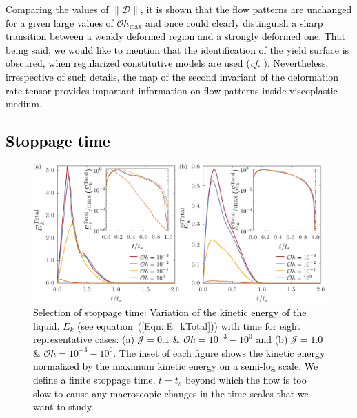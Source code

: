 \documentclass[final]{jfm}
\newcommand*\red{\textcolor{black}}
\begin{document}
\red{Comparing the values of $\|\boldsymbol{\mathcal{D}}\|$, it is shown that the flow patterns are unchanged for a given large values of $\mathcal{O}h_{\text{max}}$ and once could clearly distinguish a sharp transition between a weakly deformed region and a strongly deformed one. That being said, we would like to mention that the identification of the yield surface is obscured, when regularized constitutive models are used (\textit{cf.} \cite{frigaard2005usage}). Nevertheless, irrespective of such details, the map of the second invariant of the deformation rate tensor provides important information on flow patterns inside viscoplastic medium.}

\subsection{\red{Stoppage time}}\label{App::StoppageTime}
\begin{figure}
	\centerline{\includegraphics[width=\linewidth]{FigureE2_StoppageTime-eps-converted-to.pdf}}%
	\caption{\red{Selection of stoppage time: Variation of the kinetic energy of the liquid, $E_k$ (see equation~(\ref{Eqn::E_kTotal})) with time for eight representative cases: (a) $\mathcal{J} = 0.1$ \& $\mathcal{O}h = 10^{-3} - 10^0$ and (b) $\mathcal{J} = 1.0$  \& $\mathcal{O}h = 10^{-3} - 10^0$. The inset of each figure shows the kinetic energy normalized by the maximum kinetic energy on a semi-log scale. We define a finite stoppage time, $t = t_s$ beyond which the flow is too slow to cause any macroscopic changes in the time-scales that we want to study.}}
	\label{fig:StoppageTime}
\end{figure}
\end{document}
